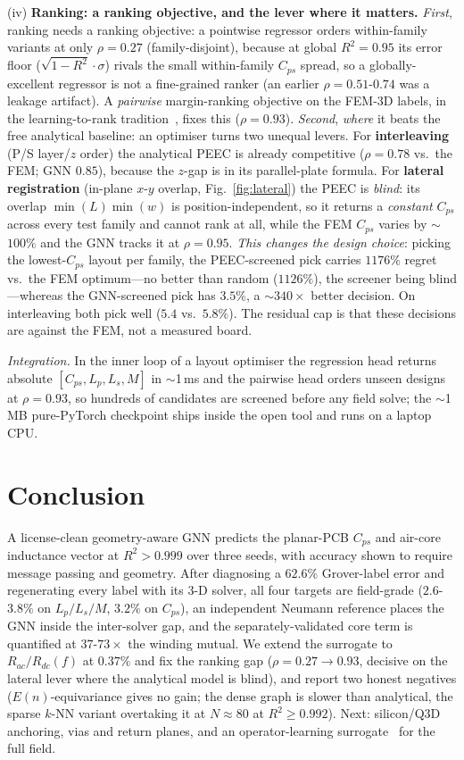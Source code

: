 \documentclass[letterpaper,twocolumn,9pt]{extarticle}
\begin{document}
(iv) \textbf{Ranking: a ranking objective, and the lever where it matters.}
\emph{First}, ranking needs a ranking objective: a pointwise regressor orders
within-family variants at only $\rho=0.27$ (family-disjoint), because at global
$R^2=0.95$ its error floor ($\sqrt{1-R^2}\cdot\sigma$) rivals the small
within-family $C_{ps}$ spread, so a globally-excellent regressor is not a
fine-grained ranker (an earlier $\rho=0.51$-$0.74$ was a leakage artifact). A
\emph{pairwise} margin-ranking objective on the FEM-3D labels, in the
learning-to-rank tradition~\cite{ranknet,lambdamart}, fixes this ($\rho=0.93$).
\emph{Second}, \emph{where} it beats the free analytical baseline: an optimiser
turns two unequal levers. For \textbf{interleaving} (P/S layer/$z$ order) the
analytical PEEC is already competitive ($\rho=0.78$ vs.\ the FEM; GNN $0.85$),
because the $z$-gap is in its parallel-plate formula. For \textbf{lateral
registration} (in-plane $x$-$y$ overlap, Fig.~\ref{fig:lateral}) the PEEC is
\emph{blind}: its overlap $\min(L)\min(w)$ is position-independent, so it returns
a \emph{constant} $C_{ps}$ across every test family and cannot rank at all, while
the FEM $C_{ps}$ varies by $\sim$$100\%$ and the GNN tracks it at $\rho=0.95$.
\emph{This changes the design choice}: picking the lowest-$C_{ps}$ layout per
family, the PEEC-screened pick carries $1176\%$ regret vs.\ the FEM optimum---no
better than random ($1126\%$), the screener being blind---whereas the
GNN-screened pick has $3.5\%$, a $\sim$$340\times$ better decision. On
interleaving both pick well ($5.4$ vs.\ $5.8\%$). The residual cap is that these
decisions are against the FEM, not a measured board.

\emph{Integration.} In the inner loop of a layout optimiser the regression head
returns absolute $[C_{ps},L_p,L_s,M]$ in $\sim$1\,ms and the pairwise head orders
unseen designs at $\rho=0.93$, so hundreds of candidates are screened before any
field solve; the $\sim$1\,MB pure-PyTorch checkpoint ships inside the open tool
and runs on a laptop CPU.

\section{Conclusion}
A license-clean geometry-aware GNN predicts the planar-PCB $C_{ps}$ and air-core
inductance vector at $R^2>0.999$ over three seeds, with accuracy shown to require message
passing and geometry. After diagnosing a $62.6\%$ Grover-label error and
regenerating every label with its 3-D solver, all four targets are field-grade
($2.6$-$3.8\%$ on $L_p/L_s/M$, $3.2\%$ on $C_{ps}$), an independent Neumann
reference places the GNN inside the inter-solver gap, and the separately-validated
core term is quantified at $37$-$73\times$ the winding mutual. We extend the
surrogate to $R_{ac}/R_{dc}(f)$ at $0.37\%$ and fix the ranking gap ($\rho=0.27
\rightarrow 0.93$, decisive on the lateral lever where the analytical model is
blind), and report two honest negatives ($E(n)$-equivariance gives no gain; the
dense graph is slower than analytical, the sparse $k$-NN variant overtaking it at
$N\!\approx\!80$ at $R^2\ge0.992$). Next: silicon/Q3D anchoring, vias and return
planes, and an operator-learning surrogate~\cite{fno,deeponet} for the full field.
\end{document}
